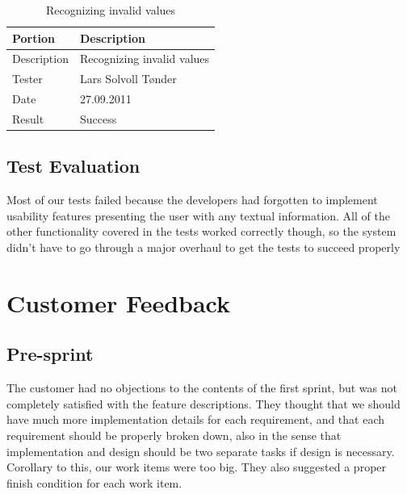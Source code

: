 \begin{table}[!ht] \footnotesize \center
\caption{Supporting configuration files \label{tab:sp1_tid06}}
\noindent{}
\end{table}

\begin{table}[!ht] \footnotesize \center
\caption{Recognizing invalid values \label{tab:sp1_tid07}}
\begin{tabular}{l l}
	\toprule
	Portion & Description \\
	\midrule
	Description &  Recognizing invalid values  \\
	Tester & Lars Solvoll Tønder \\
	Date & 27.09.2011 \\
	Result & Success\\
	\bottomrule
\end{tabular}
\end{table}

\subsection{Test Evaluation}
Most of our tests failed because the developers had forgotten to implement usability features presenting the user with any textual information. All of the other functionality covered in the tests worked correctly though, so the system didn't have to go through a major overhaul to get the tests to succeed properly

\section{Customer Feedback}

\subsection{Pre-sprint}
The customer had no objections to the contents of the first sprint, but was not completely satisfied with the feature descriptions. They thought that we should have much more implementation details for each requirement, and that each requirement should be properly broken down, also in the sense that implementation and design should be two separate tasks if design is necessary. Corollary to this, our work items were too big. They also suggested a proper finish condition for each work item.
